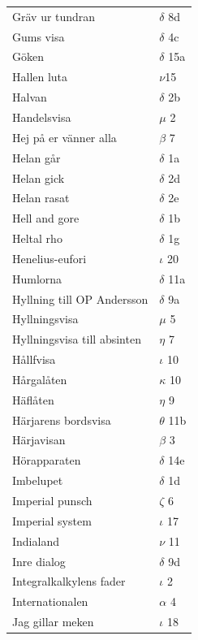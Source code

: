 \documentclass[a6paper,10pt]{article}
\begin{document}
\newpage
\begin{table}[!h]
\begin{tabular}{l l}
Gräv ur tundran&$\delta$ 8d\\
Gums visa&$\delta$ 4c\\
Göken&$\delta$ 15a\\
Hallen luta&$\nu$15\\
Halvan&$\delta$ 2b\\
Handelsvisa&$\mu$ 2\\
Hej på er vänner alla&$\beta$ 7\\
Helan går&$\delta$ 1a\\
Helan gick&$\delta$ 2d\\
Helan rasat&$\delta$ 2e\\
Hell and gore&$\delta$ 1b\\
Heltal rho&$\delta$ 1g\\
Henelius-eufori&$\iota$ 20\\
Humlorna&$\delta$ 11a\\
Hyllning till OP Andersson&$\delta$ 9a\\
Hyllningsvisa&$\mu$ 5\\
Hyllningsvisa till absinten&$\eta$ 7\\
Hållfvisa&$\iota$ 10\\
Hårgalåten&$\kappa$ 10\\
Häflåten&$\eta$ 9\\
Härjarens bordsvisa&$\theta$ 11b\\
Härjavisan&$\beta$ 3\\
Hörapparaten&$\delta$ 14e\\
Imbelupet&$\delta$ 1d\\
Imperial punsch&$\zeta$ 6\\
Imperial system&$\iota$ 17\\
Indialand&$\nu$ 11\\
Inre dialog&$\delta$ 9d\\
Integralkalkylens fader&$\iota$ 2\\
Internationalen&$\alpha$ 4\\
Jag gillar meken&$\iota$ 18\\
\end{tabular}
\end{table}
\end{document}
